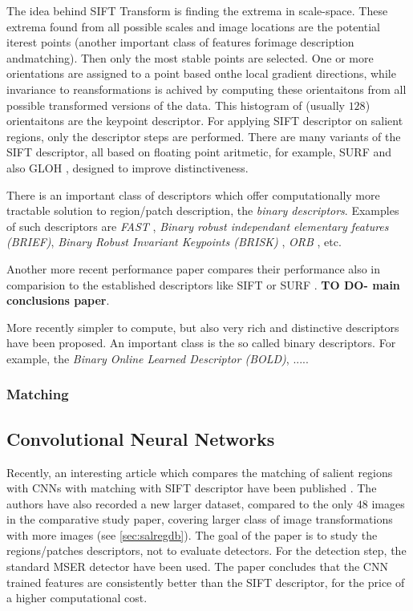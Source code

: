 The idea behind SIFT Transform is finding the extrema in scale-space. These extrema found from all possible scales and image locations are the potential iterest points (another important class of features forimage description andmatching). Then only the most stable points are selected. One or more orientations are assigned to a point based onthe local gradient directions, while invariance to reansformations is achived by computing these orientaitons from all possible transformed versions of the data.  This histogram of (usually $128$) orientaitons are the keypoint descriptor. For applying SIFT descriptor on salient regions, only the descriptor steps are performed. 
There are many variants of the SIFT descriptor, all based on floating point aritmetic, for example, SURF\cite{Bay:2008:SURF} and also GLOH \cite{MS05}, designed to improve distinctiveness.

There is an important class of descriptors which offer computationally more tractable solution to region/patch description, the {\em binary descriptors}. Examples of such descriptors are  {\em FAST} \cite{Rosten:2006}, {\em Binary robust independant elementary features (BRIEF)}\cite{Calonder:2010}, {\em Binary Robust Invariant Keypoints (BRISK)} \cite{Leutenegger:2011}, {\em  ORB} \cite{Rublee:2011}, etc.

Another more recent performance paper compares their performance also in comparision to the established descriptors like SIFT or SURF \cite{conf/icpr/MiksikM12}.
{\bf TO DO- main conclusions paper}.

More recently simpler to compute, but also very rich and distinctive descriptors have been proposed. An important class is the so called binary descriptors. For example, the {\em Binary Online Learned Descriptor (BOLD)}, \cite{Balntas_2015_CVPR}.....

\subsubsection{Matching}

\subsection{Convolutional Neural Networks}

Recently, an interesting article which compares the matching of salient regions  with CNNs with matching with SIFT descriptor have been published \cite{FischerDB14}. The authors have also recorded a new larger dataset, compared to the only $48$ images in the comparative study paper, covering larger class of image transformations with more images (see \ref{sec:salregdb}). The goal of the paper is to study the regions/patches descriptors, not to evaluate detectors. For the detection step, the standard MSER detector have been used. The paper concludes that the CNN trained features are consistently better than the SIFT descriptor, for the price of a higher computational cost.